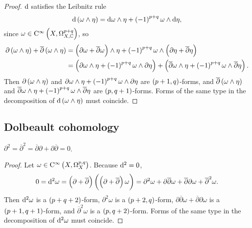 \begin{proof}
$ \mathrm{d} $ satisfies the Leibnitz rule
$$ \d\br{\omega \wedge \eta} = \d\omega \wedge \eta + \br{-1}^{p + q}\omega \wedge \d\eta, $$
since $ \omega \in \C^\infty\br{X, \Omega_{X, \CC}^{p + q}} $, so
\begin{align*}
\partial\br{\omega \wedge \eta} + \overline{\partial}\br{\omega \wedge \eta}
& = \br{\partial\omega + \overline{\partial}\omega} \wedge \eta + \br{-1}^{p + q}\omega \wedge \br{\partial\eta + \overline{\partial}\eta} \\
& = \br{\partial\omega \wedge \eta + \br{-1}^{p + q}\omega \wedge \partial\eta} + \br{\overline{\partial}\omega \wedge \eta + \br{-1}^{p + q}\omega \wedge \overline{\partial}\eta}.
\end{align*}
Then $ \partial\br{\omega \wedge \eta} $ and $ \partial\omega \wedge \eta + \br{-1}^{p + q}\omega \wedge \partial\eta $ are $ \br{p + 1, q} $-forms, and $ \overline{\partial}\br{\omega \wedge \eta} $ and $ \overline{\partial}\omega \wedge \eta + \br{-1}^{p + q}\omega \wedge \overline{\partial}\eta $ are $ \br{p, q + 1} $-forms. Forms of the same type in the decomposition of $ \d\br{\omega \wedge \eta} $ must coincide.
\end{proof}

\subsection{Dolbeault cohomology}

\begin{lemma}
$ \partial^2 = \overline{\partial}^2 = \overline{\partial}\partial + \partial\overline{\partial} = 0 $.
\end{lemma}

\begin{proof}
Let $ \omega \in \C^\infty\br{X, \Omega_X^{p, q}} $. Because $ \mathrm{d}^2 = 0 $,
$$ 0 = \d^2\omega = \br{\partial + \overline{\partial}}\br{\br{\partial + \overline{\partial}}\omega} = \partial^2\omega + \partial\overline{\partial}\omega + \overline{\partial}\partial\omega + \overline{\partial}^2\omega. $$
Then $ \mathrm{d}^2\omega $ is a $ \br{p + q + 2} $-form, $ \partial^2\omega $ is a $ \br{p + 2, q} $-form, $ \partial\overline{\partial}\omega + \overline{\partial}\partial\omega $ is a $ \br{p + 1, q + 1} $-form, and $ \overline{\partial}^2\omega $ is a $ \br{p, q + 2} $-form. Forms of the same type in the decomposition of $ \mathrm{d}^2\omega $ must coincide.
\end{proof}

